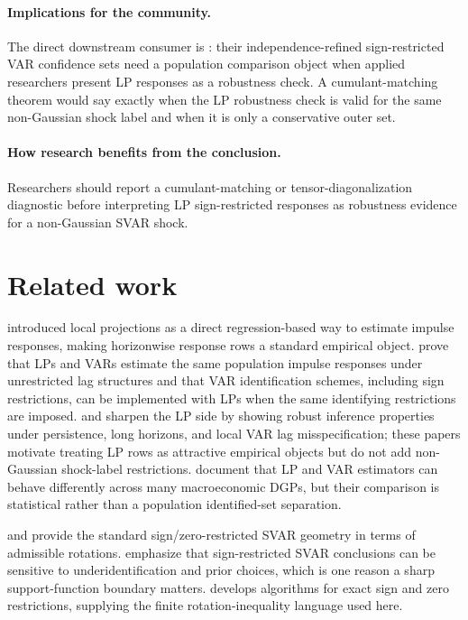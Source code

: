 \documentclass[11pt]{article}
\theoremstyle{definition}
\theoremstyle{plain}
\theoremstyle{remark}
\begin{document}
\paragraph{Implications for the community.}
The direct downstream consumer is \citet{DrautzburgWright2023}: their independence-refined sign-restricted VAR confidence sets need a population comparison object when applied researchers present LP responses as a robustness check.  A cumulant-matching theorem would say exactly when the LP robustness check is valid for the same non-Gaussian shock label and when it is only a conservative outer set.

\paragraph{How research benefits from the conclusion.}
Researchers should report a cumulant-matching or tensor-diagonalization diagnostic before interpreting LP sign-restricted responses as robustness evidence for a non-Gaussian SVAR shock.

\section{Related work}
\citet{Jorda2005} introduced local projections as a direct regression-based way to estimate impulse responses, making horizonwise response rows a standard empirical object.  \citet{PlagborgMollerWolf2021} prove that LPs and VARs estimate the same population impulse responses under unrestricted lag structures and that VAR identification schemes, including sign restrictions, can be implemented with LPs when the same identifying restrictions are imposed.  \citet{MontielOleaPlagborgMoller2021} and \citet{MontielOleaPlagborgMollerQianWolf2024} sharpen the LP side by showing robust inference properties under persistence, long horizons, and local VAR lag misspecification; these papers motivate treating LP rows as attractive empirical objects but do not add non-Gaussian shock-label restrictions.  \citet{LiPlagborgMollerWolf2024} document that LP and VAR estimators can behave differently across many macroeconomic DGPs, but their comparison is statistical rather than a population identified-set separation.

\citet{RubioRamirezWaggonerZha2010} and \citet{AriasRubioRamirezWaggoner2018} provide the standard sign/zero-restricted SVAR geometry in terms of admissible rotations.  \citet{BaumeisterHamilton2015} emphasize that sign-restricted SVAR conclusions can be sensitive to underidentification and prior choices, which is one reason a sharp support-function boundary matters.  \citet{Read2022} develops algorithms for exact sign and zero restrictions, supplying the finite rotation-inequality language used here.
\end{document}
